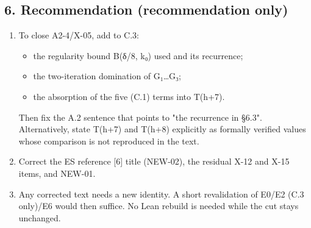\documentclass[
]{article}
\providecommand{\tightlist}{%
  \setlength{\itemsep}{0pt}\setlength{\parskip}{0pt}}
\begin{document}
\subsection{6. Recommendation (recommendation
only)}\label{6-recommendation-recommendation-only}

\begin{enumerate}
\def\labelenumi{\arabic{enumi}.}
\item
  To close A2-4/X-05, add to C.3:

  \begin{itemize}
  \tightlist
  \item
    the regularity bound B(δ/8, k₀) used and its recurrence;
  \item
    the two-iteration domination of G₁\ldots G₃;
  \item
    the absorption of the five (C.1) terms into T(h+7).
  \end{itemize}

  Then fix the A.2 sentence that points to "the recurrence in §6.3".
  Alternatively, state T(h+7) and T(h+8) explicitly as formally verified
  values whose comparison is not reproduced in the text.
\item
  Correct the ES reference {[}6{]} title (NEW-02), the residual X-12 and
  X-15 items, and NEW-01.
\item
  Any corrected text needs a new identity. A short revalidation of E0/E2
  (C.3 only)/E6 would then suffice. No Lean rebuild is needed while the
  cut stays unchanged.
\end{enumerate}
\end{document}
